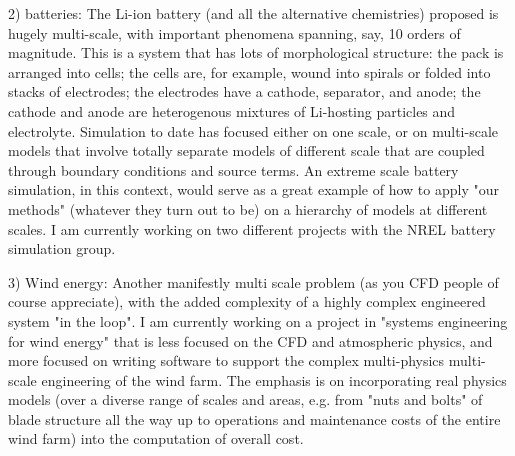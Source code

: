 \documentclass[11pt]{article}
\begin{document}
2) batteries:  The Li-ion battery (and all the alternative chemistries) proposed is hugely multi-scale, with important phenomena spanning, say, 10 
orders of magnitude.  This is a system that has lots of morphological structure: the pack is arranged into cells; the cells are, for example, wound into spirals or folded into stacks of electrodes; the electrodes have a cathode, separator, and anode; the cathode and anode are heterogenous mixtures of Li-hosting particles and electrolyte.  Simulation to date has focused either on one scale, or on multi-scale models that involve totally
separate models of different scale that are coupled through boundary conditions and source terms.  An extreme scale battery simulation, in this context,
would serve as a great example of how to apply "our methods" (whatever they turn out to be) on a hierarchy of models at different scales.
I am currently working on two different projects with the NREL battery simulation group.

3) Wind energy:  Another manifestly multi scale problem (as you CFD people of course appreciate), with the added complexity of a highly complex
engineered system "in the loop".  I am currently working on a project in "systems engineering for wind energy" that is less focused on the CFD and 
atmospheric physics, and more focused on writing software to support the complex multi-physics multi-scale engineering of the wind farm. 
The emphasis is on incorporating real physics models (over a diverse range of scales and areas, e.g. from "nuts and bolts" of blade structure 
all the way up to operations and maintenance costs of the 
entire wind farm) into the computation of overall cost.



 
\end{document}
